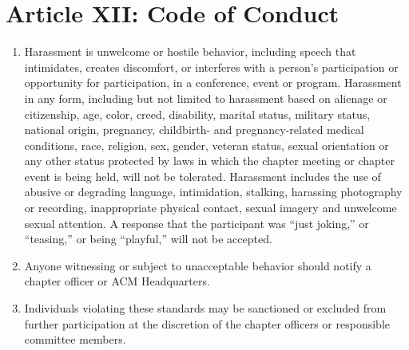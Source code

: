 \section*{Article XII: Code of Conduct}

\begin{enumerate}
    \item  Harassment is unwelcome or hostile behavior, including speech that intimidates, creates discomfort, or interferes with a person's participation or opportunity for participation, in a conference, event or program.
    Harassment in any form, including but not limited to harassment based on alienage or citizenship, age, color, creed, disability, marital status, military status, national origin, pregnancy, childbirth- and pregnancy-related medical conditions, race, religion, sex, gender, veteran status, sexual orientation or any other status protected by laws in which the chapter meeting or chapter event is being held, will not be tolerated.
    Harassment includes the use of abusive or degrading language, intimidation, stalking, harassing photography or recording, inappropriate physical contact, sexual imagery and unwelcome sexual attention.
    A response that the participant was “just joking,” or “teasing,” or being “playful,” will not be accepted.
    \item Anyone witnessing or subject to unacceptable behavior should notify a chapter officer or ACM Headquarters.
    \item Individuals violating these standards may be sanctioned or excluded from further participation at the discretion of the chapter officers or responsible committee members.
\end{enumerate}
